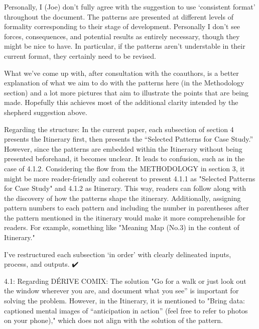 \documentclass[acmlarge,timestamp]{acmart}
\begin{document}
\begin{rightbubbles}
Personally, I (Joe) don’t fully agree with the suggestion to use
‘consistent format’ throughout the document.  The patterns are
presented at different levels of formality corresponding to their
stage of development.  Personally I don’t see forces, consequences,
and potential results as entirely necessary, though they might be nice
to have.  In particular, if the patterns aren’t understable in their
current format, they certainly need to be revised.

What we’ve come up with, after consultation with the coauthors, is a
better explanation of what we aim to do with the patterns here (in the
Methodology section) and a lot more pictures that aim to illustrate
the points that are being made.  Hopefully this achieves most of the
additional clarity intended by the shepherd suggestion above.
\end{rightbubbles}

\begin{leftbubbles}
Regarding the structure: In the current paper, each subsection of
section 4 presents the Itinerary first, then presents the “Selected
Patterns for Case Study.” However, since the patterns are embedded
within the Itinerary without being presented beforehand, it becomes
unclear. It leads to confusion, such as in the case of
4.1.2. Considering the flow from the METHODOLOGY in section 3, it
might be more reader-friendly and coherent to present 4.1.1 as
"Selected Patterns for Case Study" and 4.1.2 as Itinerary. This way,
readers can follow along with the discovery of how the patterns shape
the itinerary. Additionally, assigning pattern numbers to each pattern
and including the number in parentheses after the pattern mentioned in
the itinerary would make it more comprehensible for readers. For
example, something like "Meaning Map (No.3) in the content of
Itinerary."
\end{leftbubbles}

\begin{rightbubbles}
I’ve restructured each subsection ‘in order’ with clearly delineated
inputs, process, and outputs.  {\huge ✔️}
\end{rightbubbles}

\begin{leftbubbles}
4.1: Regarding DÉRIVE COMIX: The solution "Go for a walk or just look
out the window wherever you are, and document what you see” is
important for solving the problem. However, in the Itinerary, it is
mentioned to "Bring data: captioned mental images of “anticipation in
action” (feel free to refer to photos on your phone)," which does not
align with the solution of the pattern.
\end{leftbubbles}
\end{document}
